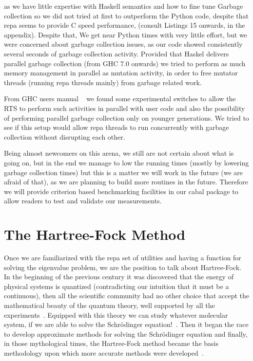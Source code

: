 \documentclass{tmr}
\begin{document}
as we have little expertise with Haskell semantics and 
how to fine tune Garbage collection so we did not tried at first to outperform the Python
code, despite that repa seems to provide C speed performance, (consult Listings 15 onwards, in the appendix).
Despite that, We get near Python times with very little effort, but we were concerned about garbage collection 
issues, as our code showed consistently several seconds of garbage collection activity. Provided that Haskel
delivers parallel garbage collection (from GHC 7.0 onwards) we tried to perform as much memory management in parallel
as mutation activity, in order to free mutator threads (running repa threads mainly) from garbage related work.

From GHC users manual ~\cite{ghc} we found some experimental switches to allow the RTS to perform such activities in parallel
with user code and also the possibility of performing parallel garbage collection only on younger generations.
We tried to see if this setup would allow repa threads to run concurrently with garbage collection without  
disrupting each other.

Being almost newcomers on this arena, we still are not certain about what is going on, but in the end we manage to low the 
running times (mostly by lowering garbage collection times) but this is a matter we will work in the future 
(we are afraid of that), as we are planning to build more routines in the future. Therefore we will provide
 criterion based benchmarking facilities in our cabal package to allow readers to test and validate our measurements.

\section{The Hartree-Fock Method}

Once we are familiarized with the repa set of utilities and having
a function for solving the eigenvalue problem, we are the position to talk about
Hartree-Fock. In the beginning of the previous century it was discovered
that the energy of physical systems is quantized (contradicting our intuition
that it must be a continuous), then all the scientific community had no other choice that accept
the mathematical beauty of the quantum theory, well supported by all the experiments~\cite{quantum}.
 Equipped with this theory we can study whatever molecular system,
if we are able to solve the Schr\"{o}dinger equation!~\cite{Schrodinger}.
Then it began the race to develop approximate methods for solving the Schr\"{o}dinger equation and
finally, in those mythological times, the Hartree-Fock method became
the basis methodology upon which more accurate methods were developed~\cite{hartree-fock}.
 
\end{document}
